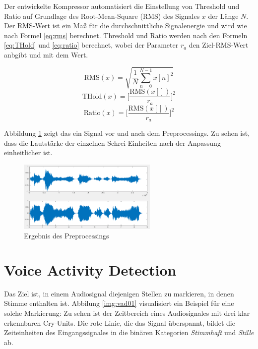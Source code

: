 Der entwickelte Kompressor automatisiert die Einstellung von Threshold und Ratio auf Grundlage des Root-Mean-Square (RMS) des Signales $x$ der Länge $N$. Der RMS-Wert ist ein Maß für die durchschnittliche Signalenergie und wird wie nach Formel \ref{eq:rms} berechnet. Threshold und Ratio werden nach den Formeln \ref{eq:THold} und \ref{eq:ratio} berechnet, wobei der Parameter $r_a$ den Ziel-RMS-Wert anbgibt und mit dem Wert.

\begin{equation}
\text{RMS}(x) = \sqrt{\frac{1}{N}\sum_{n=0}^{N-1}x[n]^2}
\label{eq:rms}
\end{equation}
\begin{equation}
\text{THold}(x) = \bigg[\frac{\text{RMS}(x[])}{r_a}\bigg]^{2}
\label{eq:THold}
\end{equation}
\begin{equation}
\text{Ratio}(x) = \bigg[\frac{\text{RMS}(x[])}{r_a}\bigg]^{2}
\label{eq:ratio}
\end{equation}

Abbildung \ref{img:compressing01} zeigt das ein Signal vor und nach dem Preprocessings. Zu sehen ist, dass die Lautstärke der einzelnen Schrei-Einheiten nach der Anpassung einheitlicher ist. 

\begin{figure}[h]
	\centering
	\includegraphics[width=0.6\textwidth]{bilder/compressing01.png}
	\caption{Ergebnis des Preprocessings}
	\label{img:compressing01}
\end{figure}

\section{Voice Activity Detection}
\label{sec:vad}

Das Ziel ist, in einem Audiosignal diejenigen Stellen zu markieren, in denen Stimme enthalten ist. Abbilung \ref{img:vad01} visualisiert ein Beispiel für eine solche Markierung: Zu sehen ist der Zeitbereich eines Audiosignales mit drei klar erkennbaren Cry-Units. Die rote Linie, die das Signal überspannt, bildet die Zeiteinheiten des Eingangssignales in die binären Kategorien \emph{Stimmhaft} und \emph{Stille} ab.

